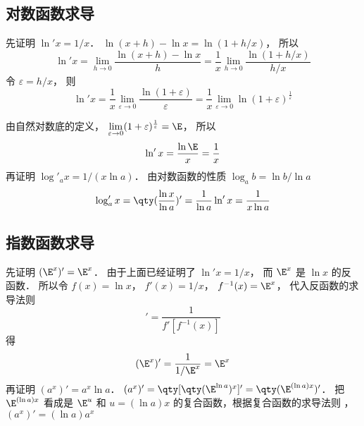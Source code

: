 \subsection{对数函数求导}
先证明 $\ln' x = {1}/{x}$．  $\ln(x + h) - \ln x = \ln(1 + h/x)$， 所以
 \begin{equation}
\ln 'x = \lim_{h \to 0} \frac{\ln(x + h) - \ln x}{h} = \frac{1}{x} \lim_{h \to 0} \frac{\ln(1 + h/x)}{h/x}
\end{equation}
令 $\varepsilon  = h/x$， 则
\begin{equation}
\ln' x = \frac{1}{x} \lim_{\varepsilon  \to 0} \frac{\ln(1 + \varepsilon)}{\varepsilon } = \frac{1}{x} \lim_{\varepsilon  \to 0} \ln(1 + \varepsilon)^{\frac{1}{\varepsilon }} 
\end{equation}
 
由自然对数底的定义， $\lim\limits_{\varepsilon  \to 0} (1 + \varepsilon)^{\frac{1}{\varepsilon }} = \E$， 所以
 \begin{equation}
\ln 'x = \frac{\ln \E}{x} = \frac{1}{x}
\end{equation}
再证明 $\log'_a x = {1}/(x\ln a)$． 
由对数函数的性质 $\log_a b = \ln b/\ln a$
\begin{equation}
\log'_a x = \qty(\frac{\ln x}{\ln a})' = \frac{1}{\ln a}\ln' x = \frac{1}{x\ln a}
\end{equation}

\subsection{指数函数求导}
先证明 $(\E^x)' = \E^x$． 
由于上面已经证明了 $ \ln'x = 1/x$， 而 $\E^x$ 是 $\ln x$ 的反函数． 所以令 $f(x) = \ln x$， $f'(x) = 1/x$，  $f^{ - 1} (x) = \E^x$， 代入反函数的求导法则%
\begin{equation}
[f^{-1} (x)]' = \frac{1}{f'[f^{ - 1}(x)]}
\end{equation} 
得
\begin{equation}
(\E^x)' = \frac{1}{1/\E^x} = \E^x
\end{equation}
再证明 $(a^x)' = a^x \ln a$．  $(a^x)' = \qty[ \qty( \E^{\ln a} )^x ]' = \qty( \E^{(\ln a) x} )'$． 把 $\E^{(\ln a) x}$ 看成是 $\E^u$ 和 $u = (\ln a) x$ 的复合函数，根据复合函数的求导法则 ，$(a^x)' = (\ln a) a^x$ 
